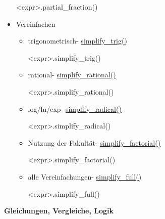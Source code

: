 \documentclass[a4paper,9pt,DIV15,twocolumn]{scrartcl}
\begin{document}
\begin{itemize}
       \begin{sagein}
<expr>.partial_fraction()
       \end{sagein}
   \item Vereinfachen
   \begin{itemize}
       \item  trigonometrisch- \href{https://sage.math.uni-goettingen.de/doc/static/reference/sage/symbolic/expression.html?highlight=simplify_full#sage.symbolic.expression.Expression.simplify_trig}{simplify\_trig()}
       \begin{sagein}
<expr>.simplify_trig() 
       \end{sagein}
        \item rational- \href{https://sage.math.uni-goettingen.de/doc/static/reference/sage/symbolic/expression.html?highlight=simplify_full#sage.symbolic.expression.Expression.simplify_rational}{simplify\_rational()}
       \begin{sagein}
<expr>.simplify_rational() 
       \end{sagein}
        \item log/ln/exp- \href{https://sage.math.uni-goettingen.de/doc/static/reference/sage/symbolic/expression.html?highlight=simplify_full#sage.symbolic.expression.Expression.simplify_radical}{simplify\_radical()}
       \begin{sagein}
<expr>.simplify_radical() 
       \end{sagein}
        \item Nutzung der Fakultät- \href{https://sage.math.uni-goettingen.de/doc/static/reference/sage/symbolic/expression.html?highlight=simplify_full#sage.symbolic.expression.Expression.simplify_factorial}{simplify\_factorial()}
       \begin{sagein}
<expr>.simplify_factorial()
       \end{sagein}
        \item alle Vereinfachungen- \href{https://sage.math.uni-goettingen.de/doc/static/reference/sage/symbolic/expression.html?highlight=simplify_full#sage.symbolic.expression.Expression.simplify_full}{simplify\_full()}
       \begin{sagein}
<expr>.simplify_full()
       \end{sagein}
       \end{itemize}

  \end{itemize}

\textbf{Gleichungen, Vergleiche, Logik}
\end{document}

